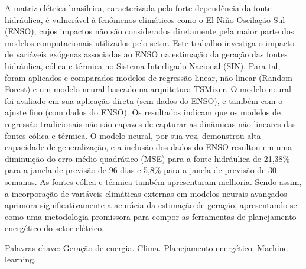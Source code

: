 \begin{resumo}
\noindent
\sloppy
A matriz elétrica brasileira, caracterizada pela forte dependência da fonte hidráulica, é vulnerável à fenômenos
climáticos como o El Niño-Oscilação Sul (ENSO), cujos impactos não são considerados diretamente pela maior parte dos modelos 
computacionais utilizados pelo setor. Este trabalho investiga o impacto de variáveis exógenas associadas 
ao ENSO na estimação da geração das fontes hidráulica, eólica e térmica no Sistema Interligado Nacional (SIN). Para tal, foram 
aplicados e comparados modelos de regressão linear, não-linear (Random Forest) e um modelo neural baseado na arquitetura TSMixer. 
O modelo neural foi avaliado em sua aplicação direta (sem dados do ENSO), e também com o ajuste fino (com dados do ENSO). Os resultados
indicam que os modelos de regressão tradicionais não são capazes de capturar as dinâmicas não-lineares das fontes eólica e térmica. 
O modelo neural, por sua vez, demonstrou alta capacidade de generalização, e a inclusão dos dados do ENSO resultou em uma diminuição 
do erro médio quadrático (MSE) para a fonte hidráulica de 21,38\% para a janela de previsão de 96 dias e 5,8\% para a janela de previsão 
de 30 semanas. As fontes eólica e térmica também apresentaram melhoria. Sendo assim, a incorporação de variáveis climáticas externas em 
modelos neurais avançados aprimora significativamente a acurácia da estimação de geração, apresentando-se como uma metodologia promissora 
para compor as ferramentas de planejamento energético do setor elétrico.

\vspace{0.2cm}
\noindent
Palavras-chave: Geração de energia. Clima. Planejamento energético. Machine learning.
\end{resumo}

